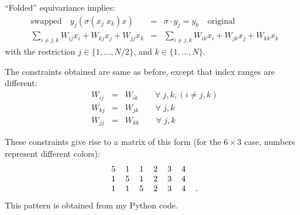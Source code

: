 ``Folded'' equivariance implies:
\begin{eqnarray}
\boxed{\mbox{swapped}} \quad y_j ( \sigma(x_j \; x_k) x) %
&=& \sigma \cdot y_j = y_k \quad \boxed{\mbox{original}} \\
\sum_{i \neq j,k} W_{ij} x_i + W_{kj} x_j + W_{jj} x_k &=& \sum_{i \neq j,k} W_{ik} x_i + W_{jk} x_j + W_{kk} x_k  \nonumber
\end{eqnarray}
with the restriction $j \in \{ 1,..., N/2 \}$, and $k \in \{ 1,..., N \}$.

The constraints obtained are same as before, except that index ranges are different:
\begin{eqnarray}
W_{ij} &=& W_{ik} \quad \quad \forall \;  j, k, (i \neq j, k) \nonumber \\
W_{kj} &=& W_{jk} \quad \quad \forall \;  j, k \nonumber \\
W_{jj} &=& W_{kk} \quad \quad \forall \;  j, k \nonumber
\end{eqnarray}

These constraints give rise to a matrix of this form (for the $6 \times 3$ case, numbers represent different colors):
\begin{equation}
\begin{tabular}{c c c c c c c}
5 & 1 & 1 & 2 & 3 & 4 & \\
1 & 5 & 1 & 2 & 3 & 4 & \\
1 & 1 & 5 & 2 & 3 & 4 & .
\end{tabular} 
\end{equation}This pattern is obtained from my Python code.

